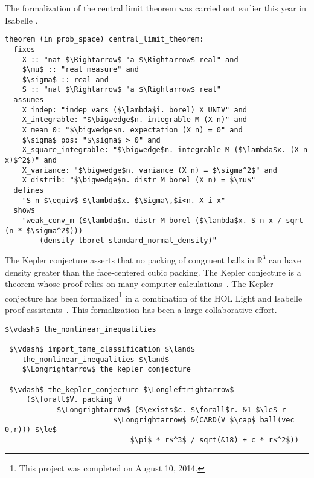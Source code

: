 \documentclass[brochure,english,12pt]{bourbaki}
\theoremstyle{plain}
\def\ring#1{{\mathbb{#1}}}
\begin{document}
The formalization of the central limit theorem was carried out earlier this year in Isabelle \cite{avigad2014central}.

\begin{lstlisting}[keepspaces=true,stringstyle=\tt,basicstyle=\small,frame=single,framesep=8pt,mathescape,morekeywords={theorem,fixes,assumes,defines,shows,Variable,Theorem,Proof,Qed},columns=flexible]
theorem (in prob_space) central_limit_theorem:
  fixes 
    X :: "nat $\Rightarrow$ 'a $\Rightarrow$ real" and
    $\mu$ :: "real measure" and
    $\sigma$ :: real and
    S :: "nat $\Rightarrow$ 'a $\Rightarrow$ real"
  assumes
    X_indep: "indep_vars ($\lambda$i. borel) X UNIV" and
    X_integrable: "$\bigwedge$n. integrable M (X n)" and
    X_mean_0: "$\bigwedge$n. expectation (X n) = 0" and
    $\sigma$_pos: "$\sigma$ > 0" and
    X_square_integrable: "$\bigwedge$n. integrable M ($\lambda$x. (X n x)$^2$)" and
    X_variance: "$\bigwedge$n. variance (X n) = $\sigma^2$" and
    X_distrib: "$\bigwedge$n. distr M borel (X n) = $\mu$"
  defines
    "S n $\equiv$ $\lambda$x. $\Sigma\,$i<n. X i x"
  shows
    "weak_conv_m ($\lambda$n. distr M borel ($\lambda$x. S n x / sqrt (n * $\sigma^2$))) 
        (density lborel standard_normal_density)"
\end{lstlisting}



The Kepler conjecture asserts that no packing of congruent balls in
$\ring{R}^3$ can have density greater than the face-centered cubic
packing.  The Kepler conjecture is a theorem whose proof relies on
many computer calculations~\cite{Hales:2006:DCG}.  The 
Kepler conjecture has been formalized\footnote{This project was completed on August 10, 2014.} in a combination of the HOL
Light and Isabelle proof assistants~\cite{website:FlyspeckProject}.  This formalization has
been a large collaborative effort. 

\begin{lstlisting}[keepspaces=true,stringstyle=\tt,basicstyle=\small,frame=single,framesep=8pt,framextopmargin=10pt,mathescape,morekeywords={Variable,Theorem,Proof,Qed},columns=flexible]
 $\vdash$ the_nonlinear_inequalities

 $\vdash$ import_tame_classification $\land$      
    the_nonlinear_inequalities $\land$
    $\Longrightarrow$ the_kepler_conjecture

 $\vdash$ the_kepler_conjecture $\Longleftrightarrow$
     ($\forall$V. packing V
            $\Longrightarrow$ ($\exists$c. $\forall$r. &1 $\le$ r
                         $\Longrightarrow$ &(CARD(V $\cap$ ball(vec 0,r))) $\le$
                             $\pi$ * r$^3$ / sqrt(&18) + c * r$^2$))
\end{lstlisting}
\end{document}
